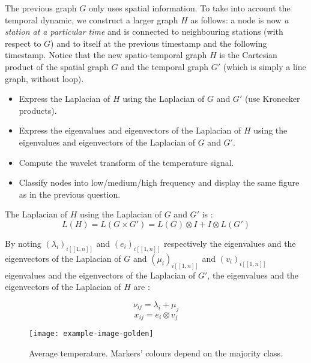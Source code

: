 \documentclass[11pt]{article}
\begin{document}
\newpage
\begin{exercise}
The previous graph $G$ only uses spatial information.
To take into account the temporal dynamic, we construct a larger graph $H$ as follows: a node is now \textit{a station at a particular time} and is connected to neighbouring stations (with respect to $G$) and to itself at the previous timestamp and the following timestamp.
Notice that the new spatio-temporal graph $H$ is the Cartesian product of the spatial graph $G$ and the temporal graph $G'$ (which is simply a line graph, without loop).

\begin{itemize}
    \item Express the Laplacian of $H$ using the Laplacian of $G$ and $G'$ (use Kronecker products).
    \item Express the eigenvalues and eigenvectors of the Laplacian of $H$ using the eigenvalues and eigenvectors of the Laplacian of $G$ and $G'$.
    \item Compute the wavelet transform of the temperature signal.
    \item Classify nodes into low/medium/high frequency and display the same figure as in the previous question.
\end{itemize}
\end{exercise}

\begin{solution}

The Laplacian of $H$ using the Laplacian of $G$ and $G'$ is : 
$$ L(H) = L(G \times G') = L(G) \otimes I + I \otimes L(G')$$ 

By noting $(\lambda_i)_{i [[1,n]]}$ and $(e_i)_{i [[1,n]]}$ respectively the eigenvalues and the eigenvectors of the Laplacian of $G$ and $(\mu_i)_{i [[1,n]]}$ and  $(v_i)_{i [[1,n]]}$ eigenvalues and the eigenvectors of the Laplacian of $G'$, the eigenvalues and the eigenvectors of the Laplacian of $H$ are : 

$$ \nu_{ij} = \lambda_i + \mu_j $$
$$ x_{ij} =  e_{i}\otimes v_j $$


\begin{figure}
    \centering
    \begin{minipage}[t]{0.8\textwidth}
    \centerline{\texttt{[image: example-image-golden]}}
    \end{minipage}
    \caption{Average temperature. Markers' colours depend on the majority class.}
\end{figure}
\end{solution}
\end{document}
